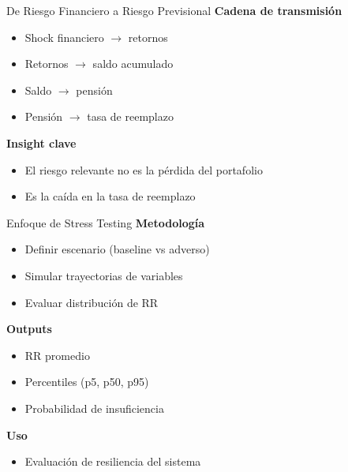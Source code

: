 \documentclass{beamer}
\begin{document}
\begin{frame}{De Riesgo Financiero a Riesgo Previsional}
\textbf{Cadena de transmisión}

\begin{itemize}
\item Shock financiero $\rightarrow$ retornos
\item Retornos $\rightarrow$ saldo acumulado
\item Saldo $\rightarrow$ pensión
\item Pensión $\rightarrow$ tasa de reemplazo
\end{itemize}

\vspace{0.3cm}

\textbf{Insight clave}
\begin{itemize}
\item El riesgo relevante no es la pérdida del portafolio
\item Es la caída en la tasa de reemplazo
\end{itemize}
\end{frame}

\begin{frame}{Enfoque de Stress Testing}
\textbf{Metodología}

\begin{itemize}
\item Definir escenario (baseline vs adverso)
\item Simular trayectorias de variables
\item Evaluar distribución de RR
\end{itemize}

\vspace{0.3cm}

\textbf{Outputs}
\begin{itemize}
\item RR promedio
\item Percentiles (p5, p50, p95)
\item Probabilidad de insuficiencia
\end{itemize}

\vspace{0.3cm}

\textbf{Uso}
\begin{itemize}
\item Evaluación de resiliencia del sistema
\end{itemize}
\end{frame}
\end{document}
